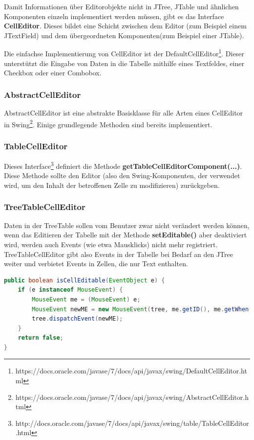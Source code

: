 Damit Informationen über Editorobjekte nicht in JTree, JTable und ähnlichen Komponenten einzeln implementiert werden müssen, gibt es das Interface \textbf{CellEditor}. Dieses bildet eine Schicht zwischen dem Editor (zum Beispiel einem JTextField) und dem übergeordneten Komponenten(zum Beispiel einer JTable).

Die einfachse Implementierung von CellEditor ist der DefaultCellEditor\footnote{https://docs.oracle.com/javase/7/docs/api/javax/swing/DefaultCellEditor.html}. Dieser unterstützt die Eingabe von Daten in die Tabelle mithilfe eines Textfeldes, einer Checkbox oder einer Combobox.

\subsubsection*{AbstractCellEditor}
AbstractCellEditor ist eine abstrakte Basisklasse für alle Arten eines CellEditor in Swing\footnote{https://docs.oracle.com/javase/7/docs/api/javax/swing/AbstractCellEditor.html}. Einige grundlegende Methoden sind bereits implementiert.

\subsubsection*{TableCellEditor}
Dieses Interface\footnote{http://docs.oracle.com/javase/7/docs/api/javax/swing/table/TableCellEditor.html} definiert die Methode \textbf{getTableCellEditorComponent(...)}. Diese Methode sollte den Editor (also den Swing-Komponenten, der verwendet wird, um den Inhalt der betroffenen Zelle zu modifizieren) zurückgeben.

\subsubsection*{TreeTableCellEditor}
Daten in der TreeTable sollen vom Benutzer zwar nicht verändert werden können, wenn das Editieren der Tabelle mit der Methode \textbf{setEditable()} aber deaktiviert wird, werden auch Events (wie etwa Mausklicks) nicht mehr registriert. TreeTableCellEditor gibt also Events in der Tabelle bei Bedarf an den JTree weiter und verbietet Events in Zellen, die nur Text enthalten.
\begin{lstlisting}[language=JAVA]
public boolean isCellEditable(EventObject e) {
	if (e instanceof MouseEvent) {
     	MouseEvent me = (MouseEvent) e;
    	MouseEvent newME = new MouseEvent(tree, me.getID(), me.getWhen(), me.getModifiers(), me.getX() - table.getCellRect(0, 0, true).x, me.getY(), 2, me.isPopupTrigger());
    	tree.dispatchEvent(newME);
  	}
  	return false;
}
\end{lstlisting}

